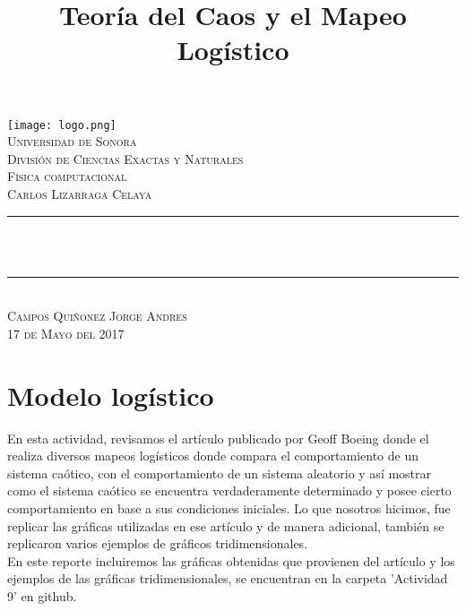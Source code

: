 \documentclass{article}
\title{Teoría del Caos y el Mapeo Logístico}
\makeatletter
\let\thetitle\@title
\makeatother
\begin{document}
\begin{titlepage}
\centering
  \vspace*{0.5 cm}
   \texttt{[image: logo.png]}\\[0.5 cm]%
    \textsc{\LARGE Universidad de Sonora}\\[1.0 cm]	%
	\textsc{\LARGE División de Ciencias Exactas y Naturales}\\[0.5 cm]	
    
	\textsc{\LARGE Física computacional}\\
    \textsc{\Large Carlos Lizarraga Celaya}\\ [0.5 cm]
    \rule{\linewidth}{0.2 mm} \\[0.4 cm]
	{ \huge \bfseries \thetitle}\\
	\rule{\linewidth}{0.2 mm} \\[0.5 cm]
    \textsc{\Large Campos Quiñonez Jorge Andres} \\[0.25 cm]
   \textsc {\large 17 de Mayo del 2017} 	

	
 
	\vfill
	
\end{titlepage}
\pagebreak

\newpage

\pagebreak

\pagebreak
\onehalfspacing

\section*{\Large Modelo logístico}
En esta actividad, revisamos el artículo publicado por Geoff Boeing donde el realiza diversos mapeos logísticos donde compara el comportamiento de un sistema caótico, con el comportamiento de un sistema aleatorio y así mostrar como el sistema caótico se encuentra verdaderamente determinado y posee cierto comportamiento en base a sus condiciones iniciales. Lo que nosotros hicimos, fue replicar las gráficas utilizadas en ese artículo y de manera adicional, también se replicaron varios ejemplos de gráficos tridimensionales.\\

En este reporte incluiremos las gráficas obtenidas que provienen del artículo y los ejemplos de las gráficas tridimensionales, se encuentran en la carpeta 'Actividad 9' en github.
\end{document}
